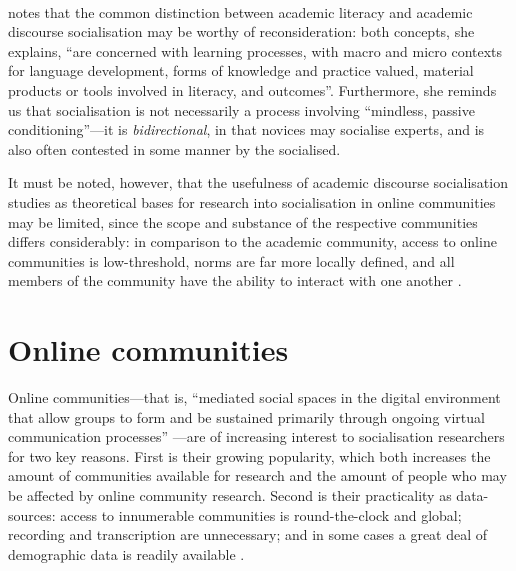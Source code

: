 		 ~\\

	  \textcite[p.~171]{duff_language_2010} notes that the common distinction between academic literacy and academic discourse socialisation may be worthy of reconsideration: both concepts, she explains, ``are concerned with learning processes, with macro and micro contexts for language development, forms of knowledge and practice valued, material products or tools involved in literacy, and outcomes''. Furthermore, she reminds us that socialisation is not necessarily a process involving ``mindless, passive conditioning''---it is \emph{bidirectional}, in that novices may socialise experts, and is also often contested in some manner by the socialised.

	  It must be noted, however, that the usefulness of academic discourse socialisation studies as theoretical bases for research into socialisation in online communities may be limited, since the scope and substance of the respective communities differs considerably: in comparison to the academic community, access to online communities is low-threshold, norms are far more locally defined, and all members of the community have the ability to interact with one another \cite{postmes_formation_2000,stommel_online_2010}. %

   \section{Online communities}

	  Online communities---that is, ``mediated social spaces in the digital environment that allow groups to form and be sustained primarily through ongoing virtual communication processes'' \cite[p.~986]{shen_effects_2013}---are of increasing interest to socialisation researchers for two key reasons. First is their growing popularity, which both increases the amount of communities available for research and the amount of people who may be affected by online community research. Second is their practicality as data-sources: access to innumerable communities is round-the-clock and global; recording and transcription are unnecessary; and in some cases a great deal of demographic data is readily available \cite{leech_new_2006}.

